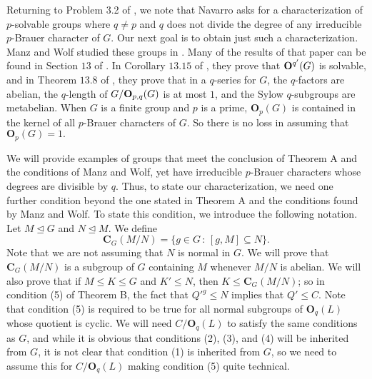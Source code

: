 \documentclass[12pt]{amsart}
\theoremstyle{remark}
\numberwithin{equation}{section}
\begin{document}
Returning to Problem 3.2 of \cite{N1}, we note that Navarro asks for a characterization of $p$-solvable groups where $q \ne p$ and $q$ does not divide the degree of any irreducible $p$-Brauer character of $G$.  Our next goal is to obtain just such a characterization.  Manz and Wolf studied these groups in \cite{MW2}.  Many of the results of that paper can be found in Section $13$ of \cite{MW1}.  In Corollary $13.15$ of \cite{MW1}, they prove that ${\bf O}^{q'} (G)$ is solvable, and in Theorem $13.8$ of \cite{MW1}, they prove that in a $q$-series for $G$, the $q$-factors are abelian, the $q$-length of $G/{\bf O}_{p,q} (G)$ is at most $1$, and the Sylow $q$-subgroups are metabelian.  When $G$ is a finite group and $p$ is a prime, ${\mathbf{O}}_p(G)$ is contained in the kernel of all $p$-Brauer characters of $G.$  So there is no loss in assuming that ${\mathbf{O}}_p(G)=1.$  

We will provide examples of groups that meet the conclusion of Theorem A and the conditions of Manz and Wolf, yet have irreducible $p$-Brauer characters whose degrees are divisible by $q$.  Thus, to state our characterization, we need one further condition beyond the one stated in Theorem A and the conditions found by Manz and Wolf.  To state this condition, we introduce the following notation. Let $M\unlhd G$ and $N\unlhd M.$  We define $${\mathbf{C}}_G(M/N)=\{g\in G\,:\, [g,M]\subseteq N\}.$$  Note that we are not assuming that $N$ is normal in $G$.  We will prove that ${\mathbf{C}}_G(M/N)$ is a subgroup of $G$ containing $M$ whenever $M/N$ is abelian.  We will also prove that if $M \le K \le G$ and $K' \le N$, then $K \le {\mathbf{C}}_G (M/N)$; so in condition (5) of Theorem B, the fact that $Q'^g \le N$ implies that $Q' \le C$.  Note that condition (5)  is required to be true for all normal subgroups of ${\mathbf{O}}_q (L)$ whose quotient is cyclic.  We will need $C/{\mathbf{O}}_q (L)$ to satisfy the same conditions as $G$, and while it is obvious that conditions (2), (3), and (4) will be inherited from $G$, it is not clear that condition (1) is inherited from $G$, so we need to assume this for $C/{\mathbf{O}}_q (L)$ making condition (5) quite technical.
\end{document}
